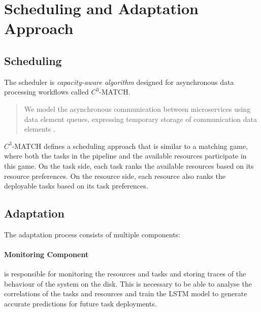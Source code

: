 
  

  



  

\section{Scheduling and Adaptation Approach}
\label{sec:scheduling-and-adaptation-approach-architecture}

  \subsection{Scheduling}
  \label{sec:scheduling-saa-background}

    The scheduler is \emph{capacity-aware algorithm} designed for asynchronous data processing workflows called $C^3$-MATCH.

    \begin{quote}
        We model the asynchronous communication between microservices using data element queues, expressing temporary storage of communication data elements \cite{mehranMatchingbasedSchedulingAsynchronous2022}.
    \end{quote}

    $C^3$-MATCH defines a scheduling approach that is similar to a matching game, where both the tasks in the pipeline and the available resources participate in this game.
    On the task side, each task ranks the available resources based on its resource preferences.
    On the resource side, each resource also ranks the deployable tasks based on its task preferences.

  \subsection{Adaptation}
  \label{sec:adaptation-saa-background}

      The adaptation process consists of multiple components:

      \paragraph{Monitoring Component } is responsible for monitoring the resources and tasks and storing traces of the behaviour of the system on the disk.
      This is necessary to be able to analyse the correlations of the tasks and resources and train the LSTM model to generate accurate predictions for future task deployments.

